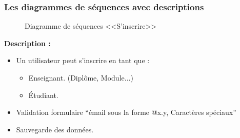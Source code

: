 \documentclass[12pt]{report}
\begin{document}
\subsubsection{\large{Les diagrammes de séquences avec descriptions}}

\begin{figure}[h]
\centering
    \centerline{}
    \caption{Diagramme de séquences <<S'inscrire>>}
\end{figure}

\textbf{Description :}

\begin{itemize}
    \item Un utilisateur peut s'inscrire en tant que :
    \begin{itemize}
        \item Enseignant. (Diplôme, Module...)
        \item Étudiant.
    \end{itemize}
    \item Validation formulaire ``émail sous la forme @x.y, Caractères spéciaux''
    \item Sauvegarde des données.
\end{itemize}
\end{document}
